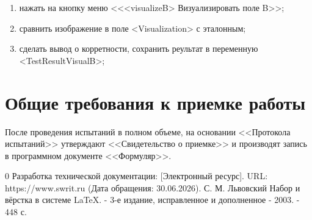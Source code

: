 \documentclass[14pt,a4paper,final]{extreport}
\begin{document}
\begin{enumerate}[label=\arabic*.]
\begin{enumerate}[label*=\arabic*.,
                      leftmargin=1.5cm, %
                      labelsep=0.5cm]
    \item нажать на кнопку меню <<<visualizeB> Визуализировать поле B>>;
    \item сравнить изображение в поле <Visualization> с эталонным;
    \item сделать вывод о корретности, сохранить реультат в переменную <TestResultVisualB>;
    \end{enumerate}

\end{enumerate}



\section{Общие требования к приемке работы}
После проведения испытаний в полном объеме, на основании <<Протокола испытаний>> утверждают <<Свидетельство о приемке>> и производят запись в программном документе <<Формуляр>>.


\pagebreak

\fancyhead[C]{\bfseries\thepage\\\docstamp}  %

\begin{thebibliography}{0}
	 Разработка технической документации: [Электронный ресурс]. URL:
	https://www.swrit.ru (Дата обращения: 30.06.2026).
	 С. М. Львовский Набор и вёрстка в системе \LaTeX. - 3-е издание, исправленное и дополненное - 2003. - 448 с.
\end{thebibliography}
\pagebreak

\label{lastpage}
\end{document}
